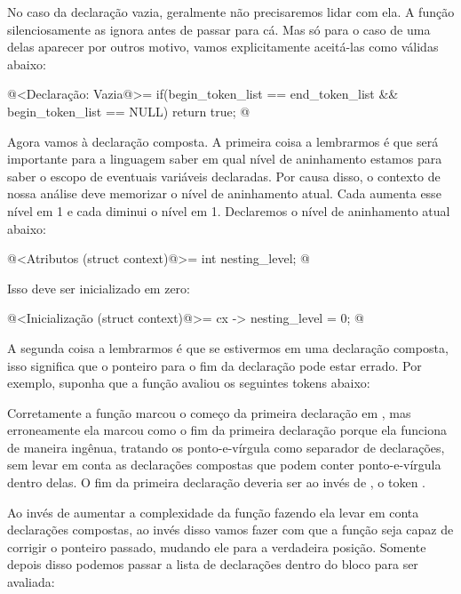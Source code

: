 No caso da declaração vazia, geralmente não precisaremos lidar com
ela. A função  silenciosamente
as ignora antes de passar para cá. Mas só para o caso de uma delas
aparecer por outros motivo, vamos explicitamente aceitá-las como
válidas abaixo:

\iniciocodigo
@<Declaração: Vazia@>=
if(begin_token_list == end_token_list && begin_token_list == NULL)
  return true;
@
\fimcodigo

Agora vamos à declaração composta. A primeira coisa a lembrarmos é que
será importante para a linguagem saber em qual nível de aninhamento
estamos para saber o escopo de eventuais variáveis declaradas. Por
causa disso, o contexto de nossa análise deve memorizar o nível de
aninhamento atual. Cada  aumenta esse nível em
1 e cada  diminui o nível em 1. Declaremos o
nível de aninhamento atual abaixo:

\iniciocodigo
@<Atributos (struct context)@>=
  int nesting_level;
@
\fimcodigo

Isso deve ser inicializado em zero:

\iniciocodigo
@<Inicialização (struct context)@>=
  cx -> nesting_level = 0;
@
\fimcodigo

A segunda coisa a lembrarmos é que se estivermos em uma declaração
composta, isso significa que o ponteiro para o fim da declaração pode
estar errado. Por exemplo, suponha que a função
 avaliou os seguintes tokens
abaixo:

\alinhaverbatim
[begingroup][T1][T2][;][T3][T4][;][endgroup][;]
\alinhanormal

Corretamente a função marcou o começo da primeira declaração
em , mas erroneamente ela
marcou  como o fim da primeira declaração porque ela
funciona de maneira ingênua, tratando os ponto-e-vírgula como
separador de declarações, sem levar em conta as declarações compostas
que podem conter ponto-e-vírgula dentro delas. O fim da primeira
declaração deveria ser ao invés de , o
token .

Ao invés de aumentar a complexidade da
função  fazendo ela levar em
conta declarações compostas, ao invés disso vamos fazer com que a
função  seja capaz de corrigir o ponteiro
passado, mudando ele para a verdadeira posição. Somente depois disso
podemos passar a lista de declarações dentro do bloco para ser
avaliada:

